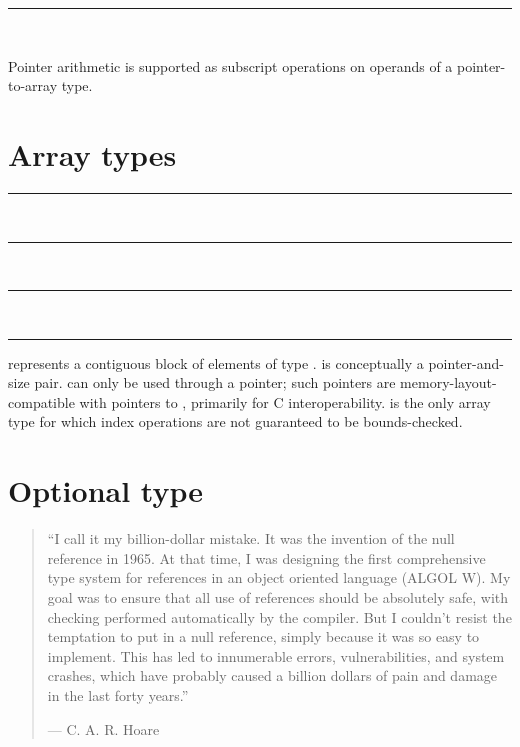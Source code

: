 \begin{grammar}
\rule{pointer-type}  \code{*}\\
\end{grammar}

\begin{samepage}
Pointer arithmetic is supported as subscript operations on operands of a
pointer-to-array type.

\end{samepage}

\section{Array types}

\begin{grammar}
\rule{array-type-with-constant-size}  \code{[}  \code{]}\\
\rule{array-type-with-runtime-size}  \code{[} \code{]}\\
\rule{array-type-with-unknown-size}  \code{[}  \code{]}\\
\rule{element-type} 
\end{grammar}

 represents a contiguous block of
 elements of type .
 is conceptually a pointer-and-size
pair.  can only be used through a
pointer; such pointers are memory-layout-compatible with pointers to
, primarily for C interoperability.
 is the only array type for which
index operations are not guaranteed to be bounds-checked.

\section{Optional type}

\begin{quote}
``I call it my billion-dollar mistake. It was the invention of the null
reference in 1965. At that time, I was designing the first comprehensive type
system for references in an object oriented language (ALGOL W). My goal was to
ensure that all use of references should be absolutely safe, with checking
performed automatically by the compiler. But I couldn't resist the temptation to
put in a null reference, simply because it was so easy to implement. This has
led to innumerable errors, vulnerabilities, and system crashes, which have
probably caused a billion dollars of pain and damage in the last forty years.''

--- C. A. R. Hoare
\end{quote}

